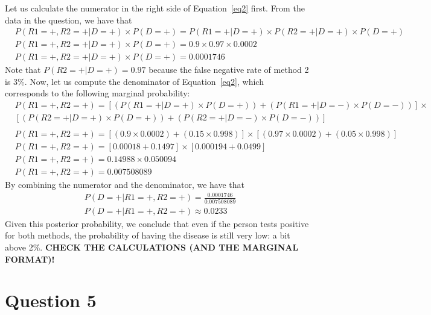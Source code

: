 \documentclass[leqno]{article}
\begin{document}
\noindent Let us calculate the numerator in the right side of Equation~\ref{eq2} first. From
the data in the question, we have that
\begin{equation*}
\begin{split}
&P(R1 = +, R2 = +| D = +) \times P(D = +) = P(R1 = +|D = +) \times P(R2 = +| D = +) \times P(D = +)
\\
&P(R1 = +, R2 = +| D = +) \times P(D = +) = 0.9 \times 0.97 \times 0.0002
\\
&P(R1 = +, R2 = +| D = +) \times P(D = +) = 0.0001746
\end{split}  
\end{equation*}  
Note that $P(R2 = +| D = +) = 0.97$ because the false negative rate of method 2 is 3\%. Now, let us
compute the denominator of Equation~\ref{eq2}, which corresponds to the following marginal
probability:
\begin{equation*}
\begin{split}
&P(R1 = +, R2 = +) = [(P(R1 = +|D = +) \times P(D = +)) + (P(R1 = +|D = -) \times P(D = -))] \times
\\
&[(P(R2 = +|D = +) \times P(D = +)) + (P(R2 = +|D = -) \times P(D = -))]
\\
\\
&P(R1 = +, R2 = +) = [(0.9 \times 0.0002) + (0.15 \times 0.998)] \times [(0.97 \times 0.0002) + (0.05 \times 0.998)]
\\
&P(R1 = +, R2 = +) = [0.00018 + 0.1497] \times [0.000194 + 0.0499]
\\
&P(R1 = +, R2 = +) = 0.14988 \times 0.050094
\\
&P(R1 = +, R2 = +) = 0.007508089
\end{split}  
\end{equation*}
By combining the numerator and the denominator, we have that
\begin{equation*}
\begin{split}
&P(D = +| R1 = +, R2 = +) = \frac{0.0001746}{0.007508089}
\\
&P(D = +| R1 = +, R2 = +) \approx 0.0233
\end{split}  
\end{equation*}
Given this posterior probability, we conclude that even if the person tests positive for both methods, the probability of having the
disease is still very low: a bit above 2\%. \textbf{CHECK THE CALCULATIONS (AND THE MARGINAL FORMAT)!}


\section*{Question 5}
\end{document}
